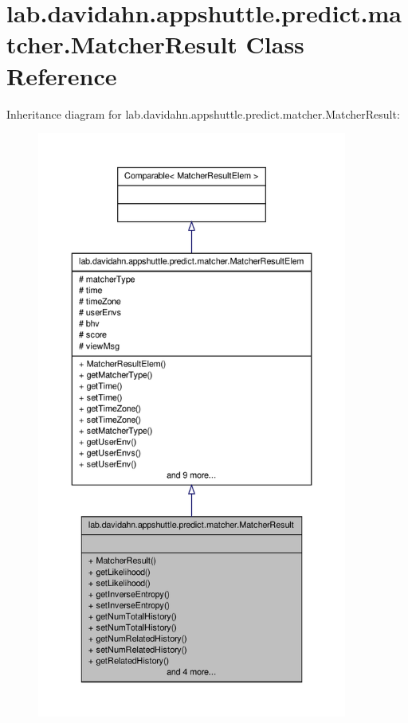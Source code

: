 \hypertarget{classlab_1_1davidahn_1_1appshuttle_1_1predict_1_1matcher_1_1_matcher_result}{\section{lab.\-davidahn.\-appshuttle.\-predict.\-matcher.\-Matcher\-Result \-Class \-Reference}
\label{classlab_1_1davidahn_1_1appshuttle_1_1predict_1_1matcher_1_1_matcher_result}
}


\-Inheritance diagram for lab.\-davidahn.\-appshuttle.\-predict.\-matcher.\-Matcher\-Result\-:
\nopagebreak
\begin{figure}[H]
\begin{center}
\leavevmode
\includegraphics[height=550pt]{classlab_1_1davidahn_1_1appshuttle_1_1predict_1_1matcher_1_1_matcher_result__inherit__graph}
\end{center}
\end{figure}


